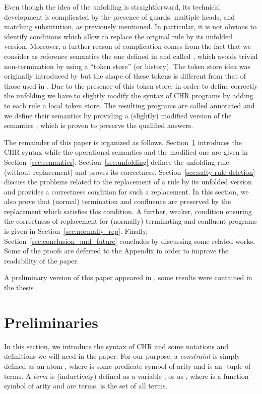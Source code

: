 \documentclass{tlp}
\begin{document}
Even though the idea of the unfolding is
straightforward, its technical development is complicated by the
presence of guards, multiple heads, and matching substitution,
as previously mentioned. In
particular, it is not obvious to identify conditions which
allow to replace the original rule by its unfolded version.
Moreover, a further reason of complication comes from the fact
that we consider as reference semantics the one
defined in \cite{DSGH04} and called , which avoids trivial non-termination by
using a  ``token store'' (or history). The token store
idea was originally introduced by \cite{Abd97} but the shape of these
tokens is different from that of those used  in \cite{DSGH04}. Due
to the presence of this token store,  in order to define correctly
the unfolding we have to slightly modify the syntax of CHR programs
by adding to each rule  a local token store. The resulting programs
are called annotated and we define their semantics by providing a
(slightly) modified version of the semantics , which is
proven to preserve the qualified answers.

The remainder of this paper is organized as follows. Section~\ref{sec:notation}
introduces the CHR syntax while the operational semantics 
\cite{DSGH04} and the modified one   are given in
Section~\ref{sec:semantics}. Section~\ref{sec:unfolding} defines
the unfolding rule (without replacement) and proves its correctness.
Section~\ref{sec:safty-rule-deletion}  discuss the problems
related to the replacement of a rule by its unfolded version and provides a correctness condition for such a replacement.
In this section, we also prove that (normal) termination and
confluence are preserved by the replacement which satisfies this condition. A further, weaker, condition ensuring the correctness of replacement for (normally) terminating and confluent programs is given in Section~\ref{sec:normally -rep}. Finally, Section~\ref{sec:conclusion_and_future} concludes
by discussing some related works. Some of the proofs are deferred to the Appendix in order to improve the readability of the paper.


A preliminary version of this paper appeared in \cite{TMG07}, some results were contained in the thesis  \cite{Tac08}.



\section{Preliminaries}\label{sec:notation}

In this section, we introduce the syntax of CHR and some notations
and definitions we will need in the paper. For our purpose, a {\em constraint} is simply defined as an atom
, where  is some predicate symbol of arity  and
 is an -tuple of terms.
A {\em term} is (inductively) defined as a variable , or as , where  is a function symbol of arity  and
 are terms.  is the set of all terms.
\end{document}
